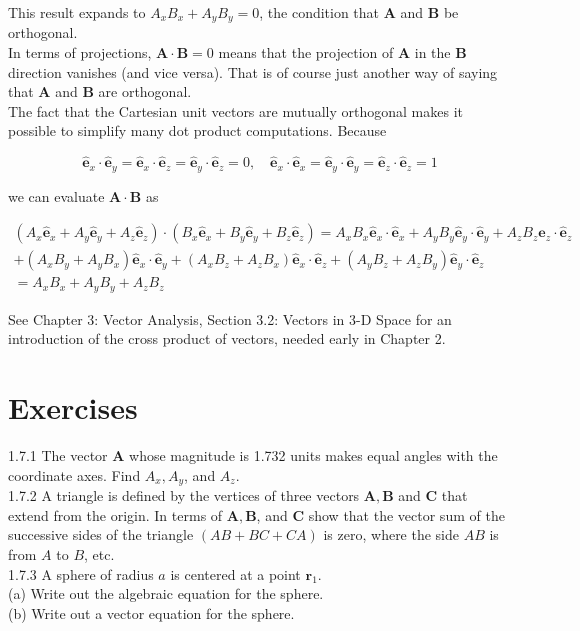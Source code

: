 \documentclass[10pt]{article}
\begin{document}
This result expands to $A_{x} B_{x}+A_{y} B_{y}=0$, the condition that $\mathbf{A}$ and $\mathbf{B}$ be orthogonal.\\
In terms of projections, $\mathbf{A} \cdot \mathbf{B}=0$ means that the projection of $\mathbf{A}$ in the $\mathbf{B}$ direction vanishes (and vice versa). That is of course just another way of saying that $\mathbf{A}$ and $\mathbf{B}$ are orthogonal.\\
The fact that the Cartesian unit vectors are mutually orthogonal makes it possible to simplify many dot product computations. Because


\begin{equation*}
\hat{\mathbf{e}}_{x} \cdot \hat{\mathbf{e}}_{y}=\hat{\mathbf{e}}_{x} \cdot \hat{\mathbf{e}}_{z}=\hat{\mathbf{e}}_{y} \cdot \hat{\mathbf{e}}_{z}=0, \quad \hat{\mathbf{e}}_{x} \cdot \hat{\mathbf{e}}_{x}=\hat{\mathbf{e}}_{y} \cdot \hat{\mathbf{e}}_{y}=\hat{\mathbf{e}}_{z} \cdot \hat{\mathbf{e}}_{z}=1 \tag{1.114}
\end{equation*}


we can evaluate $\mathbf{A} \cdot \mathbf{B}$ as

$$
\begin{gathered}
\left(A_{x} \hat{\mathbf{e}}_{x}+A_{y} \hat{\mathbf{e}}_{y}+A_{z} \hat{\mathbf{e}}_{z}\right) \cdot\left(B_{x} \hat{\mathbf{e}}_{x}+B_{y} \hat{\mathbf{e}}_{y}+B_{z} \hat{\mathbf{e}}_{z}\right)=A_{x} B_{x} \hat{\mathbf{e}}_{x} \cdot \hat{\mathbf{e}}_{x}+A_{y} B_{y} \hat{\mathbf{e}}_{y} \cdot \hat{\mathbf{e}}_{y}+A_{z} B_{z} \hat{\mathbf{e}}_{z} \cdot \hat{\mathbf{e}}_{z} \\
+\left(A_{x} B_{y}+A_{y} B_{x}\right) \hat{\mathbf{e}}_{x} \cdot \hat{\mathbf{e}}_{y}+\left(A_{x} B_{z}+A_{z} B_{x}\right) \hat{\mathbf{e}}_{x} \cdot \hat{\mathbf{e}}_{z}+\left(A_{y} B_{z}+A_{z} B_{y}\right) \hat{\mathbf{e}}_{y} \cdot \hat{\mathbf{e}}_{z} \\
=A_{x} B_{x}+A_{y} B_{y}+A_{z} B_{z}
\end{gathered}
$$

See Chapter 3: Vector Analysis, Section 3.2: Vectors in 3-D Space for an introduction of the cross product of vectors, needed early in Chapter 2.

\section*{Exercises}
1.7.1 The vector $\mathbf{A}$ whose magnitude is 1.732 units makes equal angles with the coordinate axes. Find $A_{x}, A_{y}$, and $A_{z}$.\\
1.7.2 A triangle is defined by the vertices of three vectors $\mathbf{A}, \mathbf{B}$ and $\mathbf{C}$ that extend from the origin. In terms of $\mathbf{A}, \mathbf{B}$, and $\mathbf{C}$ show that the vector sum of the successive sides of the triangle $(A B+B C+C A)$ is zero, where the side $A B$ is from $A$ to $B$, etc.\\
1.7.3 A sphere of radius $a$ is centered at a point $\mathbf{r}_{1}$.\\
(a) Write out the algebraic equation for the sphere.\\
(b) Write out a vector equation for the sphere.
\end{document}
